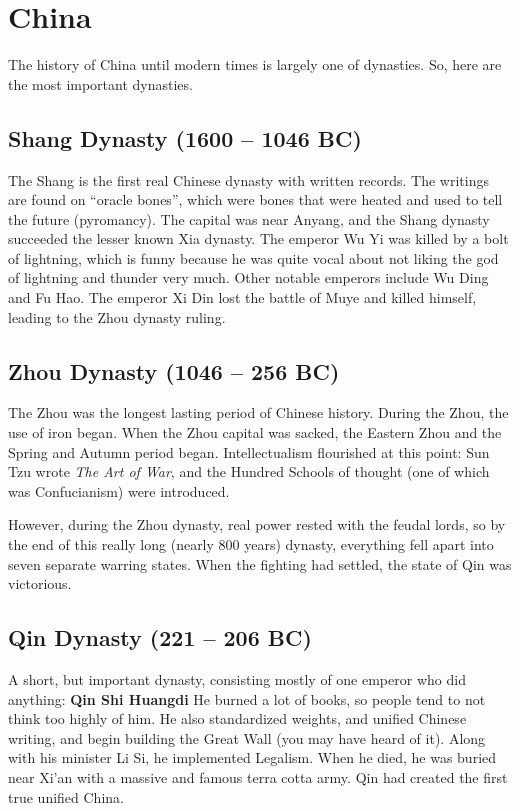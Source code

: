 \section{China}

The history of China until modern times is largely one of dynasties.
So, here are the most important dynasties.

\subsection*{Shang Dynasty (1600 -- 1046 BC)}

The Shang is the first real Chinese dynasty with written records.
The writings are found on ``oracle bones'',
which were bones that were heated and used to tell the future (pyromancy).
The capital was near Anyang, and the Shang dynasty succeeded the lesser known Xia dynasty.
The emperor Wu Yi was killed by a bolt of lightning,
which is funny because he was quite vocal about not liking the god of lightning and thunder very much.
Other notable emperors include Wu Ding and Fu Hao.
The emperor Xi Din lost the battle of Muye and killed himself,
leading to the Zhou dynasty ruling.

\subsection*{Zhou Dynasty (1046 -- 256 BC)}

The Zhou was the longest lasting period of Chinese history.
During the Zhou, the use of iron began.
When the Zhou capital was sacked, the Eastern Zhou and the Spring and Autumn period began.
Intellectualism flourished at this point:
Sun Tzu wrote \textit{The Art of War},
and the Hundred Schools of thought (one of which was Confucianism) were introduced.

However, during the Zhou dynasty, real power rested with the feudal lords, so
by the end of this really long (nearly 800 years) dynasty,
everything fell apart into seven separate warring states.
When the fighting had settled, the state of Qin was victorious.

\subsection*{Qin Dynasty (221 -- 206 BC)}

A short, but important dynasty, consisting mostly of one emperor who did anything: \textbf{Qin Shi Huangdi}
He burned a lot of books, so people tend to not think too highly of him.
He also standardized weights, and unified Chinese writing,
and begin building the Great Wall (you may have heard of it).
Along with his minister Li Si, he implemented Legalism.
When he died, he was buried near Xi'an with a massive and famous terra cotta army.
Qin had created the first true unified China.


